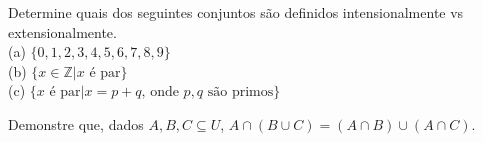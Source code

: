 \begin{exercise}
Determine quais dos seguintes conjuntos são definidos intensionalmente vs extensionalmente. \\
(a) $\{ 0, 1, 2, 3, 4, 5, 6, 7, 8, 9 \}$ \\
(b) $\{ x \in \mathbb{Z} | x \textrm{ é par} \}$ \\
(c) $\{ x \textrm{ é par} | x = p + q\textrm{, onde } p, q \textrm{ são primos} \}$
\end{exercise}

\begin{exercise}
Demonstre que, dados $A, B, C \subseteq U$, $A \cap (B \cup C) = (A \cap B) \cup (A \cap C)$.
\end{exercise}
